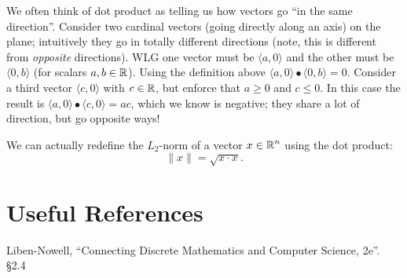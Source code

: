 We often think of dot product as telling us how vectors go ``in the same direction''. 
Consider two cardinal vectors (going directly along an axis) on the plane;
intuitively they go in totally different directions (note, this is different from \textit{opposite} directions). 
WLG one vector must be $\langle a, 0 \rangle$ and the other must be  $\langle 0,b \rangle$ (for scalars $a,b\in\operatorname{\mathbb{R}}$). 
Using the definition above $\langle a, 0 \rangle \bullet \langle 0,b \rangle = 0$.
Consider a third vector $\langle c, 0 \rangle$ with $c\in\operatorname{\mathbb{R}}$, but enforce that $a \ge 0$ and $c \le 0$. 
In this case the result is $\langle a, 0 \rangle \bullet \langle c,0 \rangle = ac$, which we know is negative; 
they share a lot of direction, but go opposite ways! 

We can actually redefine the $L_2$-norm of a vector $x\in\operatorname{\mathbb{R}}^n$ using the dot product:
\[
\|x\| = \sqrt{x \cdot x}.
\]

\section*{Useful References}
Liben-Nowell, ``Connecting Discrete Mathematics and Computer Science, 2e''. \S 2.4

